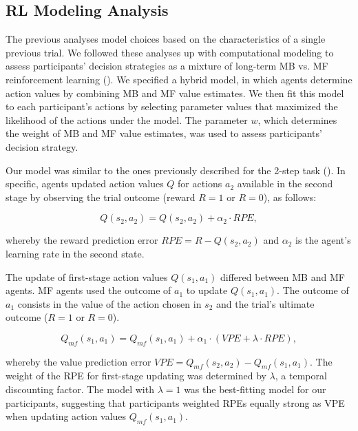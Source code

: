 \documentclass[11pt]{article} %
\begin{document}
\subsection{RL Modeling Analysis}
The previous analyses model choices based on the characteristics of a single previous trial. We followed these analyses up with computational modeling to assess participants' decision strategies as a mixture of long-term MB vs. MF reinforcement learning (\cite{sutton_reinforcement_2017}). We specified a hybrid model, in which agents determine action values by combining MB and MF value estimates. We then fit this model to each participant's actions by selecting parameter values that maximized the likelihood of the actions under the model. The parameter $w$, which determines the weight of MB and MF value estimates, was used to assess participants' decision strategy.

Our model was similar to the ones previously described for the 2-step task (\cite{wunderlich_dopamine_2012}). In specific, agents updated action values $Q$ for actions $a_{2}$ available in the second stage by observing the trial outcome (reward $R = 1$ or $R = 0$), as follows:

\begin{equation}
Q(s_{2}, a_{2}) = Q(s_{2}, a_{2}) + \alpha_{2} \cdot RPE,
\end{equation}

whereby the reward prediction error $RPE = R - Q(s_{2}, a_{2})$ and $\alpha_{2}$ is the agent's learning rate in the second state.

The update of first-stage action values $Q(s_{1}, a_{1})$ differed between MB and MF agents. MF agents used the outcome of $a_{1}$ to update $Q(s_{1}, a_{1})$. The outcome of $a_{1}$ consists in the value of the action chosen in $s_{2}$ and the trial's ultimate outcome ($R = 1$ or $R = 0$).

\begin{equation}
Q_{mf}(s_{1}, a_{1}) = Q_{mf}(s_{1}, a_{1}) + \alpha_{1} \cdot (VPE + \lambda \cdot RPE),
\end{equation}

whereby the value prediction error $VPE = Q_{mf}(s_{2}, a_{2}) - Q_{mf}(s_{1}, a_{1})$. The weight of the RPE for first-stage updating was determined by $ \lambda $, a temporal discounting factor. The model with $\lambda = 1$ was the best-fitting model for our participants, suggesting that participants weighted RPEs equally strong as VPE when updating action values $Q_{mf}(s_{1}, a_{1})$.
\end{document}
